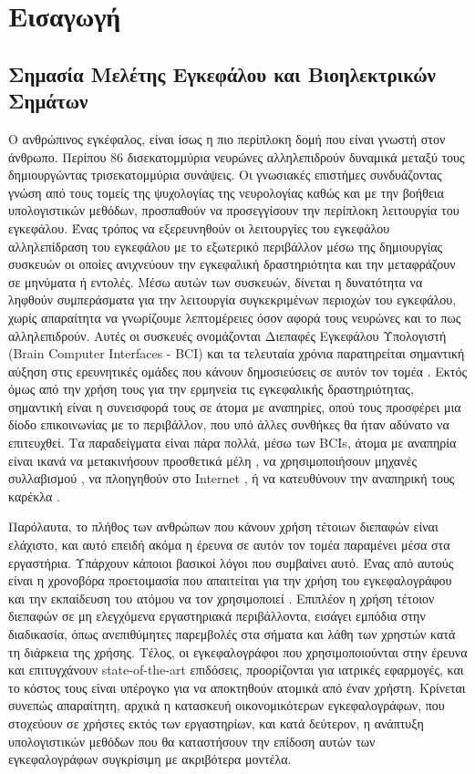 \documentclass[11pt,a4paper,english,greek,twoside]{../Thesis}
\begin{document}
\chapter{Εισαγωγή}
\section{Σημασία Μελέτης Εγκεφάλου και Βιοηλεκτρικών Σημάτων}
\label{sec:importance}
Ο ανθρώπινος εγκέφαλος, είναι ίσως η πιο περίπλοκη δομή που είναι γνωστή στον άνθρωπο. Περίπου 86 δισεκατομμύρια νευρώνες \cite{Herculano-Houzel2009-vm} αλληλεπιδρούν δυναμικά μεταξύ τους δημιουργώντας τρισεκατομμύρια συνάψεις. Οι γνωσιακές επιστήμες συνδυάζοντας γνώση από τους τομείς της ψυχολογίας της νευρολογίας καθώς και με την βοήθεια υπολογιστικών μεθόδων, προσπαθούν να προσεγγίσουν την περίπλοκη λειτουργία του εγκεφάλου. Ένας τρόπος να εξερευνηθούν οι λειτουργίες του εγκεφάλου αλληλεπίδραση του εγκεφάλου με το εξωτερικό περιβάλλον μέσω της δημιουργίας συσκευών οι οποίες ανιχνεύουν την εγκεφαλική δραστηριότητα και την μεταφράζουν σε μηνύματα ή εντολές. Μέσω αυτών των συσκευών, δίνεται η δυνατότητα να ληφθούν συμπεράσματα για την λειτουργία συγκεκριμένων περιοχών του εγκεφάλου, χωρίς απαραίτητα να γνωρίζουμε λεπτομέρειες όσον αφορά τους νευρώνες και το πως αλληλεπιδρούν. Αυτές οι συσκευές ονομάζονται Διεπαφές Εγκεφάλου Υπολογιστή (Brain Computer Interfaces - BCI) και τα τελευταία χρόνια παρατηρείται σημαντική αύξηση στις ερευνητικές ομάδες που κάνουν δημοσιεύσεις σε αυτόν τον τομέα \cite{nicolas2012brain}. Εκτός όμως από την χρήση τους για την ερμηνεία τις εγκεφαλικής δραστηριότητας, σημαντική είναι η συνεισφορά τους σε άτομα με αναπηρίες, οπού τους προσφέρει μια δίοδο επικοινωνίας με το περιβάλλον, που υπό άλλες συνθήκες θα ήταν αδύνατο να επιτευχθεί. Τα παραδείγματα είναι πάρα πολλά, μέσω των BCIs, άτομα με αναπηρία είναι ικανά να μετακινήσουν προσθετικά μέλη \cite{}, να χρησιμοποιήσουν μηχανές συλλαβισμού , να πλοηγηθούν στο Internet \cite{}, ή να κατευθύνουν την αναπηρική τους καρέκλα \cite{}.  \cite{Farwell1988TalkingPotentials}
\par Παρόλαυτα, το πλήθος των ανθρώπων που κάνουν χρήση τέτοιων διεπαφών είναι ελάχιστο, και αυτό επειδή ακόμα η έρευνα σε αυτόν τον τομέα παραμένει μέσα στα εργαστήρια. Υπάρχουν κάποιοι βασικοί λόγοι που συμβαίνει αυτό. Ένας από αυτούς είναι η χρονοβόρα προετοιμασία που απαιτείται για την χρήση του εγκεφαλογράφου και την εκπαίδευση του ατόμου να τον χρησιμοποιεί \cite{blankertz2010berlin}. Επιπλέον η χρήση τέτοιον διεπαφών σε μη ελεγχόμενα εργαστηριακά περιβάλλοντα, εισάγει εμπόδια στην διαδικασία, όπως ανεπιθύμητες παρεμβολές στα σήματα και λάθη των χρηστών κατά τη διάρκεια της χρήσης. Τέλος, οι εγκεφαλογράφοι που χρησιμοποιούνται στην έρευνα και επιτυγχάνουν state-of-the-art επιδόσεις, προορίζονται για ιατρικές εφαρμογές, και το κόστος τους είναι υπέρογκο για να αποκτηθούν ατομικά από έναν χρήστη. Κρίνεται συνεπώς απαραίτητη, αρχικά η κατασκευή οικονομικότερων εγκεφαλογράφων, που στοχεύουν σε χρήστες εκτός των εργαστηρίων, και κατά δεύτερον, η ανάπτυξη υπολογιστικών μεθόδων που θα καταστήσουν την επίδοση αυτών των εγκεφαλογράφων συγκρίσιμη με ακριβότερα μοντέλα. 
\end{document}
